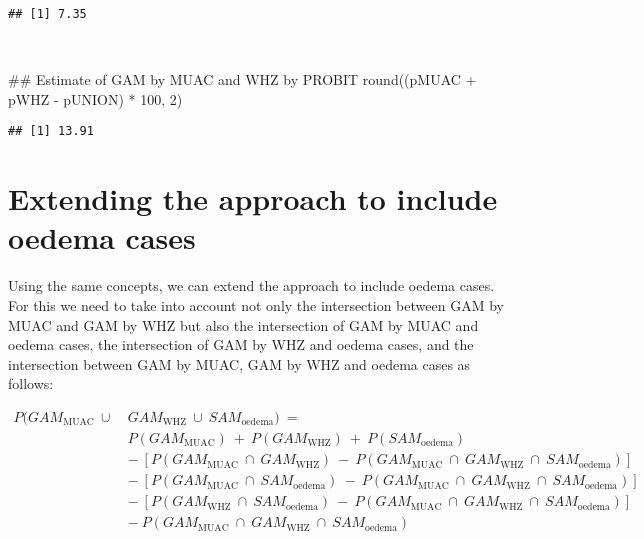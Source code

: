 \documentclass[12pt,a4paper]{article}
\newenvironment{Shaded}{}{}
\newcommand{\CommentTok}[1]{\textcolor[rgb]{0.00,0.50,0.00}{#1}}
\newcommand{\DecValTok}[1]{#1}
\newcommand{\KeywordTok}[1]{\textcolor[rgb]{0.00,0.00,1.00}{#1}}
\newcommand{\NormalTok}[1]{#1}
\newcommand{\OperatorTok}[1]{#1}
\newcommand{\StringTok}[1]{\textcolor[rgb]{0.00,0.50,0.50}{#1}}
\begin{document}
\begin{verbatim}
## [1] 7.35
\end{verbatim}

~

\begin{Shaded}
\begin{Highlighting}[]
\CommentTok{## Estimate of GAM by MUAC and WHZ by PROBIT}
\KeywordTok{round}\NormalTok{((pMUAC }\OperatorTok{+}\StringTok{ }\NormalTok{pWHZ }\OperatorTok{-}\StringTok{ }\NormalTok{pUNION) }\OperatorTok{*}\StringTok{ }\DecValTok{100}\NormalTok{, }\DecValTok{2}\NormalTok{)}
\end{Highlighting}
\end{Shaded}

\begin{verbatim}
## [1] 13.91
\end{verbatim}

\newpage

\hypertarget{extending-the-approach-to-include-oedema-cases}{%
\section{Extending the approach to include oedema cases}\label{extending-the-approach-to-include-oedema-cases}}

Using the same concepts, we can extend the approach to include oedema cases. For this we need to take into account not only the intersection between GAM by MUAC and GAM by WHZ but also the intersection of GAM by MUAC and oedema cases, the intersection of GAM by WHZ and oedema cases, and the intersection between GAM by MUAC, GAM by WHZ and oedema cases as follows:

\[\begin{aligned}
P(GAM_{\text{MUAC}} ~ \cup ~ & GAM_{\text{WHZ}} ~ \cup ~ SAM_{\text{oedema}}) ~ = \\
& P(GAM_{\text{MUAC}}) ~ + ~ P(GAM_{\text{WHZ}}) ~ + ~ P(SAM_\text{oedema}) \\ 
~ & - ~ [P(GAM_{\text{MUAC}} ~ \cap ~ GAM_{\text{WHZ}}) ~ - ~ P(GAM_{\text{MUAC}} ~ \cap ~ GAM_{\text{WHZ}} ~ \cap ~ SAM_{\text{oedema}})] \\
~ & - ~ [P(GAM_{\text{MUAC}} ~ \cap ~ SAM_{\text{oedema}}) ~ - ~ P(GAM_{\text{MUAC}} ~ \cap ~ GAM_{\text{WHZ}} ~ \cap ~ SAM_{\text{oedema}})] \\
~ & - ~ [P(GAM_{\text{WHZ}} ~ \cap ~ SAM_{\text{oedema}}) ~ - ~ P(GAM_{\text{MUAC}} ~ \cap ~ GAM_{\text{WHZ}} ~ \cap ~ SAM_{\text{oedema}})] \\
~ & - ~ P(GAM_{\text{MUAC}} ~ \cap ~ GAM_{\text{WHZ}} ~ \cap ~ SAM_{\text{oedema}})
\end{aligned}\]
\end{document}
